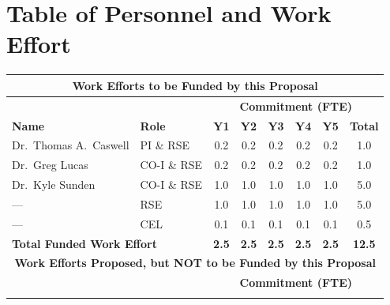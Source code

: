 \documentclass[12pt]{article}
\numberwithin{page}{section}
\begin{document}
\newpage



\newpage

\section{Table of Personnel and Work Effort}
\setcounter{page}{1}
\begin{tabular}{|l|l|c|c|c|c|c|c|}
  \hline
  \multicolumn{8}{|c|}{\cellcolor{gray!30}\textbf{Work Efforts to be Funded by this Proposal}}\\
  \hline
  \cellcolor{gray!30} &  \cellcolor{gray!30}&\multicolumn{6}{c|}{\cellcolor{gray!30}\textbf{Commitment (FTE)}} \\
  \hhline{|*2{>{\arrayrulecolor{gray!30}}-}*4{>{\arrayrulecolor{black}}-}|}
  \cellcolor{gray!30}\textbf{Name }& \cellcolor{gray!30}\textbf{Role} & \cellcolor{gray!30}\textbf{Y1} & \cellcolor{gray!30}\textbf{Y2} & \cellcolor{gray!30}\textbf{Y3}& \cellcolor{gray!30}\textbf{Y4}& \cellcolor{gray!30}\textbf{Y5} & \cellcolor{gray!30}\textbf{Total}     \\  \hline
  Dr.\ Thomas A.\ Caswell & PI \& RSE   & 0.2 & 0.2 & 0.2 & 0.2 & 0.2 & 1.0 \\  \hline
  Dr.\ Greg Lucas         & CO-I \& RSE & 0.2 & 0.2 & 0.2 & 0.2 & 0.2 & 1.0 \\  \hline
  Dr.\ Kyle Sunden        & CO-I \& RSE & 1.0 & 1.0 & 1.0 & 1.0 & 1.0 & 5.0 \\  \hline
  ---                     & RSE         & 1.0 & 1.0 & 1.0 & 1.0 & 1.0 & 5.0 \\  \hline
  ---                     & CEL         & 0.1 & 0.1 & 0.1 & 0.1 & 0.1 & 0.5 \\  \hline
  \multicolumn{2}{|l|}{\textbf{Total Funded Work Effort}} & \textbf{2.5}& \textbf{2.5}& \textbf{2.5}& \textbf{2.5}& \textbf{2.5} &  \textbf{12.5}\\    \hline
  \multicolumn{8}{|c|}{\cellcolor{gray!30}\textbf{Work Efforts Proposed, but NOT to be Funded by this Proposal}}\\  \hline
  \cellcolor{gray!30} &  \cellcolor{gray!30}&\multicolumn{6}{c|}{\cellcolor{gray!30}\textbf{Commitment (FTE)}} \\
  \hhline{|*2{>{\arrayrulecolor{gray!30}}-}*4{>{\arrayrulecolor{black}}-}|}

\end{tabular}
\end{document}
